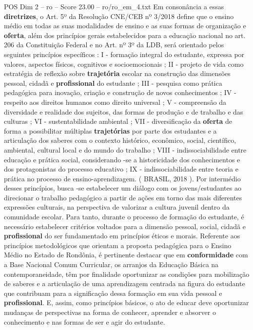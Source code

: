 \begin{textsample}{POS Dim 2 – ro – Score 23.00 – ro/ro\_em\_4.txt}
Em consonância a essas \textbf{diretrizes}, o Art. 5º da Resolução CNE/CEB nº 3/2018 define que o ensino médio em todas as suas modalidades de ensino e as suas formas de organização e \textbf{oferta}, além dos princípios gerais estabelecidos para a educação nacional no art. 206 da Constituição Federal e no Art. nº 3º da LDB, será orientado pelos seguintes princípios específicos : I - formação integral do estudante, expressa por valores, aspectos físicos, cognitivos e socioemocionais ; II - projeto de vida como estratégia de reflexão sobre \textbf{trajetória} escolar na construção das dimensões pessoal, cidadã e \textbf{profissional} do estudante ; III - pesquisa como prática pedagógica para inovação, criação e construção de novos conhecimentos ; IV - respeito aos direitos humanos como direito universal ; V - compreensão da diversidade e realidade dos sujeitos, das formas de produção e de trabalho e das culturas ; VI - sustentabilidade ambiental ; VII - diversificação da \textbf{oferta} de forma a possibilitar múltiplas \textbf{trajetórias} por parte dos estudantes e a articulação dos saberes com o contexto histórico, econômico, social, científico, ambiental, cultural local e do mundo do trabalho ; VIII - indissociabilidade entre educação e prática social, considerando -se a historicidade dos conhecimentos e dos protagonistas do processo educativo ; IX - indissociabilidade entre teoria e prática no processo de ensino-aprendizagem. ( BRASIL, 2018 ).
Por intermédio desses princípios, busca -se estabelecer um diálogo com os jovens/estudantes ao direcionar o trabalho pedagógico a partir de ações em torno das mais diferentes expressões culturais, na perspectiva de valorizar a cultura juvenil dentro da comunidade escolar.
Para tanto, durante o processo de formação do estudante, é necessário estabelecer critérios voltados para a dimensão pessoal, social, cidadã e \textbf{profissional} do ser fundamentado em princípios éticos e morais.
Referente aos princípios metodológicos que orientam a proposta pedagógica para o Ensino Médio no Estado de Rondônia, é pertinente destacar que em \textbf{conformidade} com a Base Nacional Comum Curricular, os arranjos da Educação Básica na contemporaneidade, têm por finalidade oportunizar as condições para mobilização de saberes e a articulação de uma aprendizagem centrada na figura do estudante que contribuam para a significação dessa formação em sua vida pessoal e \textbf{profissional}.
E, assim, como princípios básicos, o ato de educar deve oportunizar mudanças de perspectivas na forma de conhecer, aprender e absorver o conhecimento e nas formas de ser e agir do estudante.

\end{textsample}
